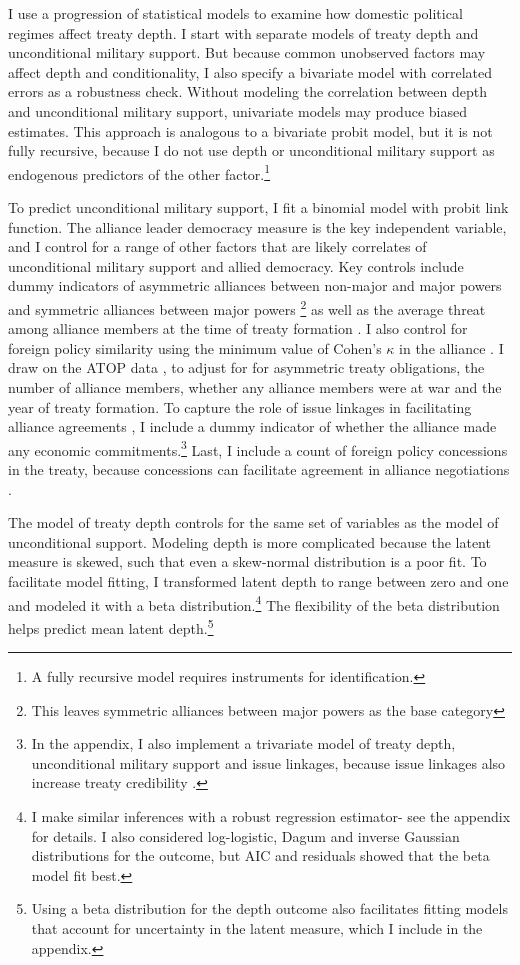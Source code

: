 \documentclass[12pt]{article}
\begin{document}
I use a progression of statistical models to examine how domestic political regimes affect treaty depth. 
I start with separate models of treaty depth and unconditional military support. 
But because common unobserved factors may affect depth and conditionality, I also specify a bivariate model with correlated errors as a robustness check. 
Without modeling the correlation between depth and unconditional military support, univariate models may produce biased estimates. 
This approach is analogous to a bivariate probit model, but it is not fully recursive, because I do not use depth or unconditional military support as endogenous predictors of the other factor.\footnote{A fully recursive model requires instruments for identification.}  


To predict unconditional military support, I fit a binomial model with probit link function. 
The alliance leader democracy measure is the key independent variable, and I control for a range of other factors that are likely correlates of unconditional military support and allied democracy. 
Key controls include dummy indicators of asymmetric alliances between non-major and major powers and symmetric alliances between major powers \citep{Mattes2012}\footnote{This leaves symmetric alliances between major powers as the base category} as well as the average threat among alliance members at the time of treaty formation \citep{LeedsSavun2007}. 
I also control for foreign policy similarity using the minimum value of Cohen's $\kappa$ in the alliance \citep{Hage2011}.
I draw on the ATOP data \citep{Leedsetal2002}, to adjust for for asymmetric treaty obligations, the number of alliance members, whether any alliance members were at war and the year of treaty formation. 
To capture the role of issue linkages in facilitating alliance agreements \citep{Poast2012}, I include a dummy indicator of whether the alliance made any economic commitments.\footnote{In the appendix, I also implement a trivariate model of treaty depth, unconditional military support and issue linkages, because issue linkages also increase treaty credibility \citep{ Poast2013}.}  
Last, I include a count of foreign policy concessions in the treaty, because concessions can facilitate agreement in alliance negotiations \citep{Johnson2015}. 


The model of treaty depth controls for the same set of variables as the model of unconditional support.  
Modeling depth is more complicated because the latent measure is skewed, such that even a skew-normal distribution is a poor fit. 
To facilitate model fitting, I transformed latent depth to range between zero and one and modeled it with a beta distribution.\footnote{I make similar inferences with a robust regression estimator- see the appendix for details. I also considered log-logistic, Dagum and inverse Gaussian distributions for the outcome, but AIC and residuals showed that the beta model fit best.}
The flexibility of the beta distribution helps predict mean latent depth.\footnote{Using a beta distribution for the depth outcome also facilitates fitting models that account for uncertainty in the latent measure, which I include in the appendix.} 
\end{document}
